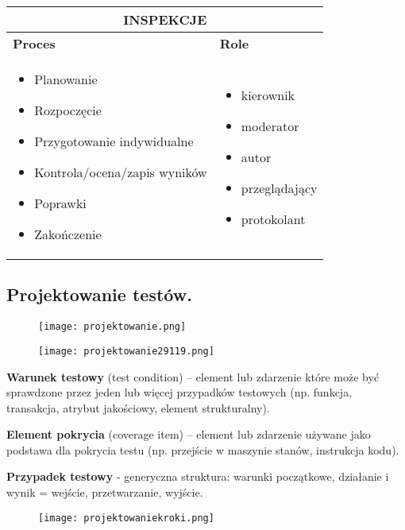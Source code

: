 \documentclass[../main.tex]{subfiles}
\begin{document}
    \begin{table}[H]
        \begin{center}
            \begin{tabular}{| p{8cm}| p{8cm}|}
                \hline
                \multicolumn{2}{|c|}{ \textbf{INSPEKCJE}}\\
                \hline
                \textbf{Proces} & \textbf{Role}\\
                \hline
                \begin{itemize}
                    \item Planowanie
                    \item Rozpoczęcie
                    \item Przygotowanie indywidualne
                    \item Kontrola/ocena/zapis wyników
                    \item Poprawki
                    \item Zakończenie
                \end{itemize}
                &
                \begin{itemize}
                    \item kierownik
                    \item moderator
                    \item autor
                    \item przeglądający
                    \item protokolant
                \end{itemize}\\
                \hline
            \end{tabular}
        \end{center}
    \end{table}


    \subsection{Projektowanie testów.}
    \begin{figure}[H]
        \texttt{[image: projektowanie.png]}
    \end{figure}
    \begin{figure}[H]
        \texttt{[image: projektowanie29119.png]}
    \end{figure}


    \textbf{Warunek testowy} (test condition) – element lub zdarzenie które może być
    sprawdzone przez jeden lub więcej przypadków testowych (np. funkcja,
    transakcja, atrybut jakościowy, element strukturalny).

    \textbf{Element pokrycia} (coverage item) – element lub zdarzenie używane jako
    podstawa dla pokrycia testu (np. przejście w maszynie stanów, instrukcja
    kodu).

    \textbf{Przypadek testowy} - generyczna struktura: warunki początkowe, działanie i wynik = wejście, przetwarzanie, wyjście.

    \begin{figure}[H]
        \texttt{[image: projektowaniekroki.png]}
    \end{figure}
\end{document}
